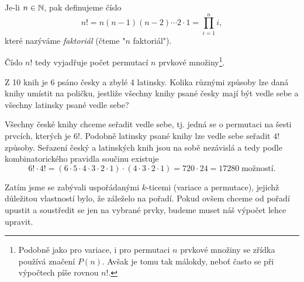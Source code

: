 \begin{definition}[Faktoriál]
    Je-li $n\in\mathbb{N}$, pak definujeme číslo
    \begin{equation*}
        n!=n(n-1)(n-2)\cdots 2\cdot 1=\prod_{i=1}^{n}i,
    \end{equation*}
    které nazýváme \emph{faktoriál} (čteme "$n$ faktoriál").
\end{definition}

Číslo $n!$ tedy vyjadřuje počet permutací $n$ prvkové množiny\footnote{Podobně jako pro variace, i pro permutaci $n$ prvkové množiny se zřídka používá značení $P(n)$. Avšak je tomu tak málokdy, neboť často se při výpočtech píše rovnou $n!$.}.

\begin{exercise}
    Z 10 knih je 6 psáno česky a zbylé 4 latinsky. Kolika různými způsoby lze daná knihy umístit na poličku, jestliže všechny knihy psané česky mají být vedle sebe a všechny latinsky psané vedle sebe?\cite{Havrlant2022}
\end{exercise}
\begin{solution}
    Všechny české knihy chceme seřadit vedle sebe, tj. jedná se o permutaci na šesti prvcích, kterých je $6!$. Podobně latinsky psané knihy lze vedle sebe seřadit $4!$ způsoby. Seřazení český a latinských knih jsou na sobě nezávislá a tedy podle kombinatorického pravidla součinu existuje
    \begin{equation*}
        6!\cdot 4!=(6\cdot 5\cdot 4\cdot 3\cdot 2\cdot 1)\cdot(4\cdot 3\cdot 2\cdot 1)=720\cdot 24=17 280\;\text{možností.}
    \end{equation*}
\end{solution}

Zatím jsme se zabývali uspořádanými $k$-ticemi (variace a permutace), jejichž důležitou vlastností bylo, že záleželo na pořadí. Pokud ovšem chceme od pořadí upustit a soustředit se jen na vybrané prvky, budeme muset náš výpočet lehce upravit.

